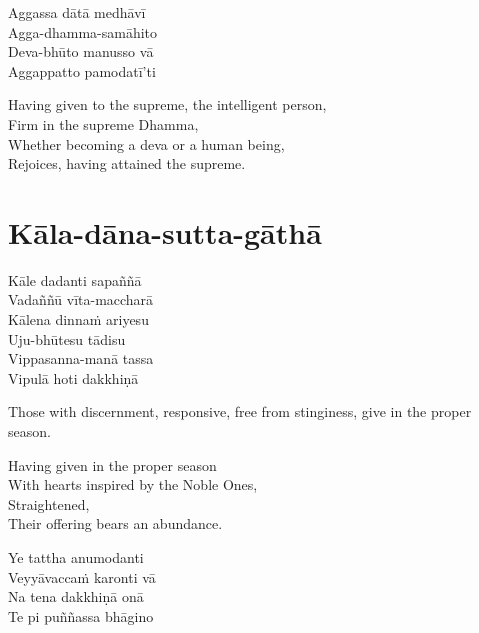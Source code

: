 \begin{pali-hang-continued}
  Aggassa dātā medhāvī\\
  Agga-dhamma-samāhito\\
  Deva-bhūto manusso vā\\
  Aggappatto pamodatī'ti
\end{pali-hang-continued}

\begin{english-verses}
  Having given to the supreme, the intelligent person,\\
  Firm in the supreme Dhamma,\\
  Whether becoming a deva or a human being,\\
  Rejoices, having attained the supreme.
\end{english-verses}

\suttaRef{[AN 5.32]}

\section{Kāla-dāna-sutta-gāthā}
\label{kala-dana-sutta-gatha}

\vspace{-0.6em}

\begin{pali-hang}
  Kāle dadanti sapaññā\\
  Vadaññū vīta-maccharā\\
  Kālena dinnaṁ ariyesu\\
  Uju-bhūtesu tādisu\\
  Vippasanna-manā tassa\\
  Vipulā hoti dakkhiṇā
\end{pali-hang}

\vspace{16pt}

\begin{english-verses}
  \begin{english-hangtogether}
    Those with discernment, responsive, free from stinginess, give in the proper season.
  \end{english-hangtogether}
  Having given in the proper season\\
  With hearts inspired by the Noble Ones,\\
  Straightened,\\
  Their offering bears an abundance.
\end{english-verses}

\begin{pali-hang-continued}
  Ye tattha anumodanti\\
  Veyyāvaccaṁ karonti vā\\
  Na tena dakkhiṇā onā\\
  Te pi puññassa bhāgino
\end{pali-hang-continued}

